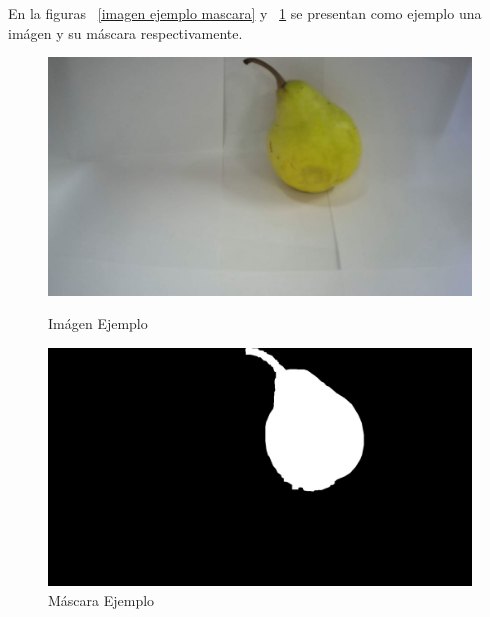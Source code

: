\documentclass[a4paper, 12pt]{article}
\begin{document}
En la figuras ~\ref{imagen ejemplo mascara} y ~\ref{mascara ejemplo mascara} se presentan como ejemplo una imágen y su máscara respectivamente.
\begin{figure}[!htbp]
    \begin{minipage}[t]{0.5\textwidth}
        \centering
        \includegraphics[width=0.8\linewidth]{imagen_mascara.jpeg}
        \caption{Imágen Ejemplo}
        \label{imagen ejemplo mascara}
    \end{minipage}%
    \begin{minipage}[t]{0.5\textwidth}
        \centering
        \includegraphics[width=0.8\linewidth]{mascara_mascara.jpeg}
        \caption{Máscara Ejemplo}
        \label{mascara ejemplo mascara}
    \end{minipage}
\end{figure}
\end{document}
